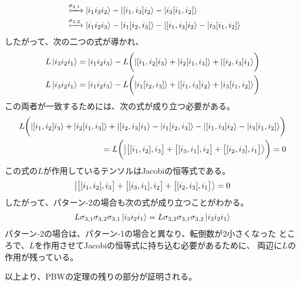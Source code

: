 {\begin{equation*}
\begin{split}
		&\xmapsto{\sigma_{3,1}} \ket{i_1i_3i_2} 
			- \ket{[i_1,i_3]i_2} - \ket{i_3[i_1,i_2]} \\
		&\xmapsto{\sigma_{3,2}} \ket{i_1i_2i_3} 
			- \ket{i_1[i_2,i_3]} - \ket{[i_1,i_3]i_2} - \ket{i_3[i_1,i_2]} \\
	\end{split}\end{equation*}
	したがって、次の二つの式が導かれ、
	\begin{equation*}\begin{split}
		L\ket{i_3i_2i_1} &= \ket{i_1i_2i_3} - L\biggl(
			\ket{[i_1,i_2]i_3} + \ket{i_2[i_1,i_3]} + \ket{[i_2,i_3]i_1}
			\biggr) \\
		L\ket{i_3i_2i_1} &= \ket{i_1i_2i_3} - L\biggl(
			\ket{i_1[i_2,i_3]} + \ket{[i_1,i_3]i_2} + \ket{i_3[i_1,i_2]}
			\biggr) \\
	\end{split}\end{equation*}
	この両者が一致するためには、次の式が成り立つ必要がある。
	\begin{equation*}\begin{split}
		L\biggl(
			\ket{[i_1,i_2]i_3} + \ket{i_2[i_1,i_3]} + \ket{[i_2,i_3]i_1}
			- \ket{i_1[i_2,i_3]} - \ket{[i_1,i_3]i_2} - \ket{i_3[i_1,i_2]}
			\biggr) \\
		= L\biggl(
			\Ket{\bigl[[i_1,i_2],i_3\bigr] + \bigl[[i_3,i_1],i_2\bigr]
			+ \bigl[[i_2,i_3],i_1\bigr]}
			\biggr) = 0
	\end{split}\end{equation*}
	この式の$L$が作用しているテンソルはJacobiの恒等式である。
	\begin{equation*}\begin{split}
		\Ket{\bigl[[i_1,i_2],i_3\bigr] + \bigl[[i_3,i_1],i_2\bigr]
			+ \bigl[[i_2,i_3],i_1\bigr]} = 0
	\end{split}\end{equation*}
	したがって、パターン-2の場合も次の式が成り立つことがわかる。
	\begin{equation*}\begin{split}
		L\sigma_{3,1}\sigma_{3,2}\sigma_{3,1}\ket{i_3i_2i_1} 
		= L\sigma_{3,2}\sigma_{3,1}\sigma_{3,2}\ket{i_3i_2i_1} 
	\end{split}\end{equation*}
	パターン-2の場合は、パターン-1の場合と異なり、転倒数が$2$小さくなった
	ところで、$L$を作用させてJacobiの恒等式に持ち込む必要があるために、
	両辺に$L$の作用が残っている。

	以上より、PBWの定理の残りの部分が証明される。

}
